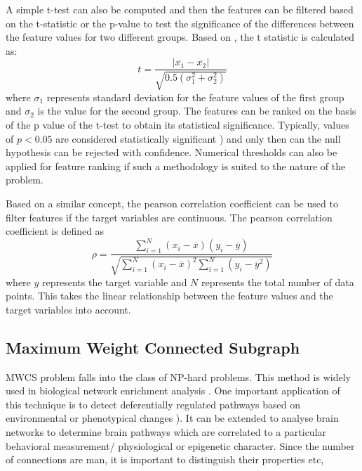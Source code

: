 \documentclass[msthesis.tex]{subfiles}
\begin{document}
A simple t-test can also be computed and then the features can be filtered based on the t-statistic or the p-value to test the significance of the differences between the feature values for two different groups. Based on \cite{inza2004filter}, the t statistic is calculated as:
\begin{equation}
    t = \frac{|\overline{x_1} - \overline{x_2}|}{\sqrt{0.5(\sigma_{1}^2 + \sigma_{2}^2)}}
\end{equation}
where $\sigma_{1}$ represents standard deviation for the feature values of the first group and $\sigma_{2}$ is the value for the second group. 
The features can be ranked on the basis of the p value of the t-test to obtain its statistical significance. Typically, values of $p<0.05$ are considered statistically significant \citep{colquhoun2017reproducibility}) and only then can the null hypothesis can be rejected with confidence. Numerical thresholds can also be applied for feature ranking if  such a methodology is suited to the nature of the problem. 

Based on a similar concept, the pearson correlation coefficient can be used to filter features if the target variables are continuous. The pearson correlation coefficient is defined as 
\begin{equation}
    \rho = \frac{\sum_{i=1}^{N} (x_{i} - \overline{x}) (y_{i} - \overline{y})}
    {\sqrt{\sum_{i=1}^{N} (x_{i}-\overline{x})^2 \sum_{i=1}^{N} (y_{i}-\overline{y}^2)}}
\end{equation}
where $y$ represents the target variable and $N$ represents the total number of data points. This takes the linear relationship between the feature values and the target variables into account.


\subsection{Maximum Weight Connected Subgraph}
\label{sec:MEWS}
\gls{MWCS} problem falls into the class of NP-hard problems. This method is widely used in biological network enrichment analysis \cite{DBLP:journals/corr/LobodaAS16}. One important application of this technique is to detect deferentially regulated pathways based on environmental or phenotypical changes \citep{althaus2014algorithms}). It can be extended to analyse brain networks to determine brain pathways which are correlated to a particular behavioral measurement/ physiological or epigenetic character. Since the number of connections are man, it is important to distinguish their properties etc, 
\end{document}
